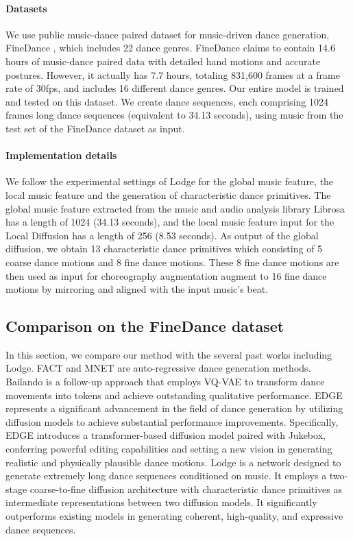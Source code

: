 
\paragraph{Datasets} We use public music-dance paired dataset for music-driven dance generation, FineDance \cite{li2023finedance}, which includes 22 dance genres. FineDance claims to contain 14.6 hours of music-dance paired data with detailed hand motions and accurate postures. However, it actually has 7.7 hours, totaling 831,600 frames at a frame rate of 30fps, and includes 16 different dance genres. Our entire model is trained and tested on this dataset. We create dance sequences, each comprising 1024 frames long dance sequences (equivalent to 34.13 seconds), using music from the test set of the FineDance dataset as input.
\paragraph{Implementation details} 
We follow the experimental settings of Lodge for the global music feature, the local music feature and the generation of characteristic dance primitives. The global music feature extracted from the music and audio analysis library Librosa \cite{mcfee2015librosa} has a length of 1024 (34.13 seconds), and the local music feature input for the Local Diffusion has a length of 256 (8.53 seconds). As output of the global diffusion, we obtain 13 characteristic dance primitives which consisting of 5 coarse dance motions and 8 fine dance motions. These 8 fine dance motions are then used as input for choreography augmentation augment to 16 fine dance motions by mirroring and aligned with the input music's beat.

\subsection{Comparison on the FineDance dataset}
In this section, we compare our method with the several past works including Lodge. FACT \cite{li2021ai} and MNET \cite{kim2022brand}are auto-regressive dance generation methods. Bailando \cite{siyao2022bailando} is a follow-up approach that employs VQ-VAE to transform dance movements into tokens and achieve outstanding qualitative performance. EDGE represents a significant advancement in the field of dance generation by utilizing diffusion models to achieve substantial performance improvements. Specifically, EDGE introduces a transformer-based diffusion model paired with Jukebox, conferring powerful editing capabilities and setting a new vision in generating realistic and physically plausible dance motions. Lodge is a network designed to generate extremely long dance sequences conditioned on music. It employs a two-stage coarse-to-fine diffusion architecture with characteristic dance primitives as intermediate representations between two diffusion models. It significantly outperforms existing models in generating coherent, high-quality, and expressive dance sequences.

